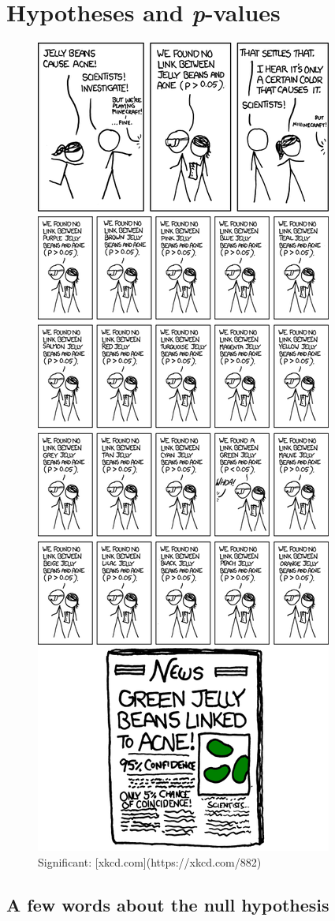 \documentclass[
]{book}
\begin{document}
\hypertarget{hypotheses-and-p-values}{%
\chapter{\texorpdfstring{Hypotheses and \emph{p}-values}{Hypotheses and p-values}}\label{hypotheses-and-p-values}}

\begin{figure}

{\centering \includegraphics[width=0.5\linewidth]{./images/significant_xkcd} 

}

\caption{Significant: [xkcd.com](https://xkcd.com/882)}\label{fig:jellybeans}
\end{figure}

\hypertarget{a-few-words-about-the-null-hypothesis}{%
\section{A few words about the null hypothesis}\label{a-few-words-about-the-null-hypothesis}}
\end{document}
